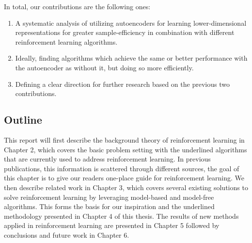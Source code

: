 In total, our contributions are the following ones:
\begin{enumerate}
	\item A systematic analysis of utilizing autoencoders for learning lower-dimensional
	representations for greater sample-efficiency in combination with different
	reinforcement learning algorithms.
	\item Ideally, finding algorithms which achieve the same or better performance with the autoencoder
	as without it, but doing so more efficiently.
	\item Defining a clear direction for further research based on the previous two contributions.
\end{enumerate}

\subsection{Outline}


This report will first describe the background theory of reinforcement learning in Chapter 2,
which covers the basic problem setting with the underlined algorithms that 
are currently used to address reinforcement learning.
In previous publications, 
this information is scattered through different sources, 
the goal of this chapter is to give our readers one-place guide for reinforcement learning.
We then describe related work in Chapter 3,
which covers several existing solutions to solve reinforcement learning by 
leveraging model-based and model-free algorithms. 
This forms the basis for our inspiration and the underlined methodology 
presented in Chapter 4 of this thesis. 
The results of new methods applied in reinforcement learning are presented in 
Chapter 5 followed by conclusions and future work in Chapter 6.



